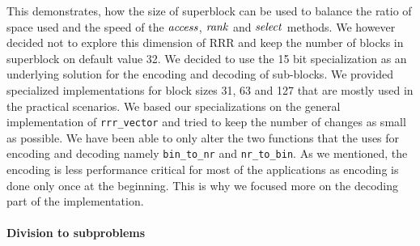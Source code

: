 This demonstrates, how the size of superblock can be used to balance the ratio of space used and the
speed of the $\mathit{access}$, $\mathit{rank}$ and $\mathit{select}$ methods. We however decided not to explore this dimension
of RRR and keep the number of blocks in superblock on default value 32. 
We decided to use the 15 bit specialization as an underlying solution for the encoding and decoding of
sub-blocks. We provided specialized implementations for block sizes 31, 63 and 127 that are mostly used
in the practical scenarios. We based our specializations on the general implementation of
\texttt{rrr\_vector} and tried to keep the number of changes as small as possible. We have been able
to only alter the two functions that the \sdsl uses for encoding and decoding namely \texttt{bin\_to\_nr}
and \texttt{nr\_to\_bin}. As we mentioned, the encoding is less performance critical for most of the
applications as encoding is done only once at the beginning. This is why we focused more on the
decoding part of the implementation.

\paragraph{Division to subproblems}

